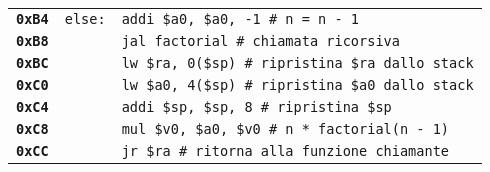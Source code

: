 \documentclass[../main.tex]{subfiles}
\begin{document}
\begin{tabular}{ l l l }
    \textbf{\texttt{0xB4}} & \texttt{else:} & \texttt{addi \$a0, \$a0, -1 \hspace*{0cm} \# n = n - 1} \\
    \textbf{\texttt{0xB8}} & & \texttt{jal factorial \hspace*{0cm} \hspace*{0cm} \hspace*{0cm} \hspace*{0cm} \hspace*{0cm} \# chiamata ricorsiva} \\
    \textbf{\texttt{0xBC}} & & \texttt{lw \$ra, 0(\$sp) \hspace*{0cm} \hspace*{0cm} \hspace*{0cm} \hspace*{0cm} \# ripristina \$ra dallo stack} \\
    \textbf{\texttt{0xC0}} & & \texttt{lw \$a0, 4(\$sp) \hspace*{0cm} \hspace*{0cm} \hspace*{0cm} \hspace*{0cm} \# ripristina \$a0 dallo stack} \\
    \textbf{\texttt{0xC4}} & & \texttt{addi \$sp, \$sp, 8 \hspace*{0cm} \hspace*{0cm} \# ripristina \$sp} \\
    \textbf{\texttt{0xC8}} & & \texttt{mul \$v0, \$a0, \$v0 \hspace*{0cm} \# n * factorial(n - 1)} \\
    \textbf{\texttt{0xCC}} & & \texttt{jr \$ra \hspace*{0cm} \hspace*{0cm} \hspace*{0cm} \hspace*{0cm} \hspace*{0cm} \hspace*{0cm} \hspace*{0cm} \hspace*{0cm} \hspace*{0cm} \hspace*{0cm} \hspace*{0cm} \hspace*{0cm} \# ritorna alla funzione chiamante} \\
\end{tabular}
\end{document}
